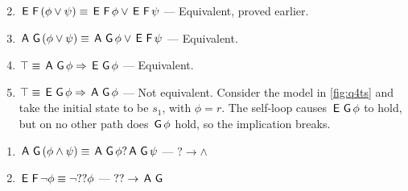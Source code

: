 \question

\begin{arabicparts}

    \questionpart
    \renewcommand{\labelenumii}{(\alph{enumii})}
    \begin{enumerate}
        \setcounter{enumii}{1}
        \item $\,\textsf{E}\,\,\textsf{F}\, (\phi \lor \psi) \equiv \,\textsf{E}\,\,\textsf{F}\,
        \phi \lor \,\textsf{E}\,\,\textsf{F}\, \psi$ --- Equivalent, proved earlier.

        \item $\,\textsf{A}\,\,\textsf{G}\, (\phi \lor \psi) \equiv \,\textsf{A}\,\,\textsf{G}\, \phi
            \lor \,\textsf{E}\,\,\textsf{F}\, \psi$ --- Equivalent.
        
        \setcounter{enumii}{6}
        \item $\top \equiv \,\textsf{A}\,\,\textsf{G}\,\phi \Rightarrow \,\textsf{E}\,\,\textsf{G}\,\phi$ --- Equivalent.
        
        \item $\top \equiv \,\textsf{E}\,\,\textsf{G}\,\phi \Rightarrow
            \,\textsf{A}\,\,\textsf{G}\,\phi$ --- Not equivalent. Consider the model in
            \autoref{fig:q4ts} and take the initial state to be $s_1$, with
            $\phi = r$. The self-loop causes $\,\textsf{E}\,\,\textsf{G}\, \phi$ to
            hold, but on no other path does $\,\textsf{G}\,\phi$ hold, so the
            implication breaks.
    \end{enumerate}

    \questionpart 
    \begin{enumerate}
        \item $\,\textsf{A}\,\,\textsf{G}\, (\phi \land \psi) \equiv \,\textsf{A}\,\,\textsf{G}\, \phi ? \,\textsf{A}\,\,\textsf{G}\, \psi$ --- $? \rightarrow \land$
        \item $\,\textsf{E}\,\,\textsf{F}\,\lnot\phi \equiv \lnot ?? \phi$ --- $?? \rightarrow \,\textsf{A}\,\,\textsf{G}\,$
    \end{enumerate}

\end{arabicparts}